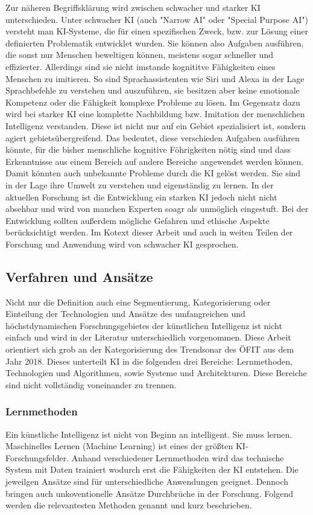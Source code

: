 \documentclass[a4paper,12pt, german]{report}
\begin{document}
Zur näheren Begriffsklärung wird zwischen schwacher und starker KI unterschieden. Unter schwacher KI (auch "Narrow AI" oder "Special Purpose AI")  versteht man KI-Systeme, die für einen spezifischen Zweck, bzw. zur Lösung einer definierten Problematik entwicklet wurden. Sie können also Aufgaben ausführen, die sonst nur Menschen beweltigen können, meistens sogar schneller und effizierter. Allerdings sind sie nicht imstande kognititve Fähigkeiten eines Menschen zu imitieren. So sind Sprachassistenten wie Siri und Alexa in der Lage Sprachbefehle zu verstehen und auszuführen, sie besitzen aber keine emotionale Kompetenz oder die Fähigkeit komplexe Probleme zu lösen.
Im Gegensatz dazu wird bei starker KI eine komplette Nachbildung bzw. Imitation der menschlichen Intelligenz verstanden. Diese ist nicht nur auf ein Gebiet spezialisiert ist, sondern agiert gebietsübergreifend. Das bedeutet, diese verschieden Aufgaben ausführen könnte, für die bisher menschliche kognitive Föhrigkeiten nötig sind und dass Erkenntnisse aus einem Bereich auf andere Bereiche angewendet werden können. Damit könnten auch unbekannte Probleme durch die KI gelöst werden. Sie sind in der Lage ihre Umwelt zu verstehen und eigenständig zu lernen. In der aktuellen Forschung ist die Entwicklung ein starken KI jedoch nicht nicht absehbar und wird von manchen Experten soagr als unmöglich eingestuft. Bei der Entwicklung sollten außerdem mögliche Gefahren und ethische Aspekte berücksichtigt werden. 
Im Kotext dieser Arbeit und auch in weiten Teilen der Forschung und Anwendung wird von schwacher KI gesprochen.

\subsection{Verfahren und Ansätze}

Nicht nur die Definition auch eine Segmentierung, Kategorisierung oder Einteilung der Technologien und Ansätze des umfangreichen und höchstdynamischen Forschungsgebietes der künstlichen Intelligenz ist nicht einfach und wird in der Literatur unterschiedlich vorgenommen. Diese Arbeit orientiert sich grob an der Kategorisierung des Trendsonar des ÖFIT aus dem Jahr 2018. Dieses unterteilt KI in die folgenden drei Bereiche: Lernmethoden, Technologien und Algorithmen, sowie Systeme und Architekturen. %
Diese Bereiche sind nicht vollständig voneinander zu trennen.  

\subsubsection{Lernmethoden}
Ein künstliche Intelligenz ist nicht von Beginn an intelligent. Sie muss lernen. Maschinelles Lernen (Machine Learning) ist eines der größten KI-Forschungsfelder. Anhand verschiedener Lernmethoden wird das technische System mit Daten trainiert wodurch erst die Fähigkeiten der KI entstehen. Die jeweilgen Ansätze sind für unterschiedliche Anwendungen geeignet. Dennoch bringen auch unkoventionelle Ansätze Durchbrüche in der Forschung. Folgend werden die relevantesten Methoden genannt und kurz beschrieben.
\end{document}
